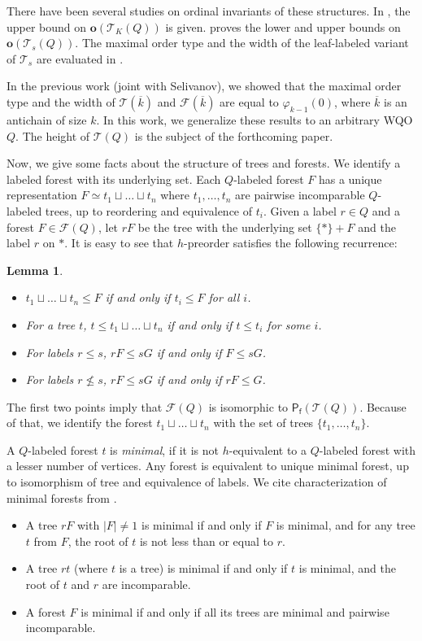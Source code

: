 \documentclass[runningheads]{llncs}
\let \leq \leqslant
\let \nleq \nleqslant
\let \phi \varphi
\renewcommand \S [1][]{\mathsf{P_f^{#1}}}
\def \T {\mathcal{T}}
\def \F {\mathcal{F}}
\def \o {\textbf{o}}
\newtheorem{lemma}{Lemma}
\begin{document}
There have been several studies on ordinal invariants of these structures. In \cite{Schmidt2020}, the upper bound on $\o(\T_K(Q))$ is given. \cite{Friedman2023} proves the lower and upper bounds on $\o(\T_s(Q))$. The maximal order type and the width of the leaf-labeled variant of $\T_s$ are evaluated in \cite{Chopra2026}.

In the previous work \cite{Selivanov2025} (joint with Selivanov), we showed that the maximal order type and the width of $\T\left(\overline{k}\right)$ and $\F\left(\overline{k}\right)$ are equal to $\phi_{k-1}(0)$, where $\overline{k}$ is an antichain of size $k$. In this work, we generalize these results to an arbitrary WQO $Q$. The height of $\T(Q)$ is the subject of the forthcoming paper.

Now, we give some facts about the structure of trees and forests. We identify a labeled forest with its underlying set. Each $Q$-labeled forest $F$ has a unique representation $F \simeq t_1 \sqcup \dots \sqcup t_n$ where $t_1,\dots,t_n$ are pairwise incomparable $Q$-labeled trees, up to reordering and equivalence of $t_i$. Given a label $r \in Q$ and a forest $F \in \F(Q)$, let $rF$ be the tree with the underlying set $\{*\}+F$ and the label $r$ on $*$. It is easy to see that $h$-preorder satisfies the following recurrence:

\begin{lemma}
    \begin{itemize}
        \item $t_1 \sqcup \dots \sqcup t_n \leq F$ if and only if $t_i \leq F$ for all $i$.
        \item For a tree $t$, $t \leq t_1 \sqcup \dots \sqcup t_n$ if and only if $t \leq t_i$ for some $i$.
        \item For labels $r \leq s$, $r F \leq s G$ if and only if $F \leq s G$.
        \item For labels $r \nleq s$, $r F \leq s G$ if and only if $r F \leq G$.
    \end{itemize}
\end{lemma}

The first two points imply that $\F(Q)$ is isomorphic to $\S(\T(Q))$. Because of that, we identify the forest $t_1 \sqcup \dots \sqcup t_n$ with the set of trees $\{t_1, \dots, t_n\}$.

A $Q$-labeled forest $t$ is \textit{minimal}, if it is not $h$-equivalent to a $Q$-labeled forest with a lesser number of vertices. Any forest is equivalent to unique minimal forest, up to isomorphism of tree and equivalence of labels. We cite characterization of minimal forests from \cite{Selivanov2011}.
\begin{itemize}
    \item A tree $rF$ with $|F| \neq 1$ is minimal if and only if $F$ is minimal, and for any tree $t$ from $F$, the root of $t$ is not less than or equal to $r$.
    \item A tree $rt$ (where $t$ is a tree) is minimal if and only if $t$ is minimal, and the root of $t$ and $r$ are incomparable.
    \item A forest $F$ is minimal if and only if all its trees are minimal and pairwise incomparable.
\end{itemize}
\end{document}

